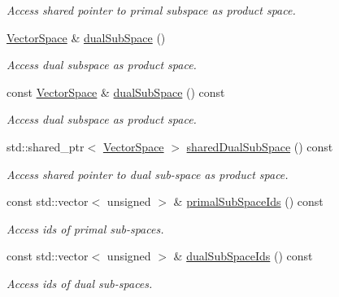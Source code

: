 \begin{DoxyCompactItemize}
\begin{DoxyCompactList}\small\item\em Access shared pointer to primal subspace as product space. \end{DoxyCompactList}\item 
\hyperlink{classSpacy_1_1VectorSpace}{Vector\+Space} \& \hyperlink{classSpacy_1_1ProductSpace_1_1VectorCreator_ab83776cf1f74a82a14efc1c054346620_ab83776cf1f74a82a14efc1c054346620}{dual\+Sub\+Space} ()
\begin{DoxyCompactList}\small\item\em Access dual subspace as product space. \end{DoxyCompactList}\item 
const \hyperlink{classSpacy_1_1VectorSpace}{Vector\+Space} \& \hyperlink{classSpacy_1_1ProductSpace_1_1VectorCreator_aeb73cfc3c6afc2afb06cbb1386d2534d_aeb73cfc3c6afc2afb06cbb1386d2534d}{dual\+Sub\+Space} () const 
\begin{DoxyCompactList}\small\item\em Access dual subspace as product space. \end{DoxyCompactList}\item 
std\+::shared\+\_\+ptr$<$ \hyperlink{classSpacy_1_1VectorSpace}{Vector\+Space} $>$ \hyperlink{classSpacy_1_1ProductSpace_1_1VectorCreator_ab21c8e91ed993a1f831e92a3312941ab_ab21c8e91ed993a1f831e92a3312941ab}{shared\+Dual\+Sub\+Space} () const 
\begin{DoxyCompactList}\small\item\em Access shared pointer to dual sub-\/space as product space. \end{DoxyCompactList}\item 
const std\+::vector$<$ unsigned $>$ \& \hyperlink{classSpacy_1_1ProductSpace_1_1VectorCreator_a89612f21ccc70a36cc0c96dbc79616d4_a89612f21ccc70a36cc0c96dbc79616d4}{primal\+Sub\+Space\+Ids} () const 
\begin{DoxyCompactList}\small\item\em Access ids of primal sub-\/spaces. \end{DoxyCompactList}\item 
const std\+::vector$<$ unsigned $>$ \& \hyperlink{classSpacy_1_1ProductSpace_1_1VectorCreator_a8efa5277e276b058bbb08ea36cd02ec4_a8efa5277e276b058bbb08ea36cd02ec4}{dual\+Sub\+Space\+Ids} () const 
\begin{DoxyCompactList}\small\item\em Access ids of dual sub-\/spaces. \end{DoxyCompactList}\item 

\end{DoxyCompactItemize}
